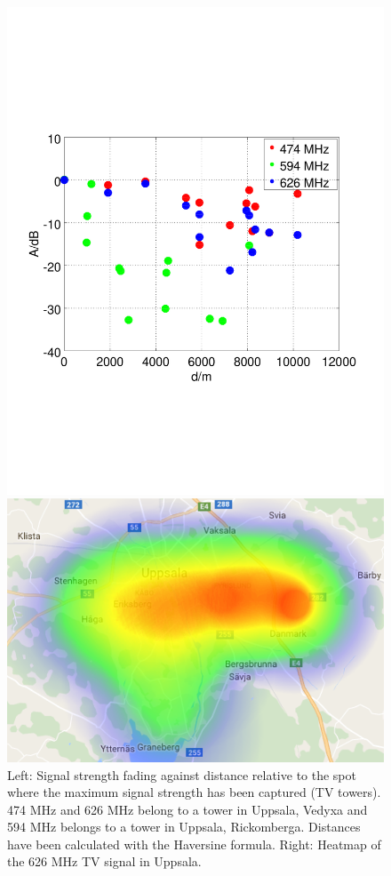 \documentclass[conference]{IEEEtran}
\begin{document}
\begin{figure}[h]
	\centering
	\begin{minipage}{0.49\columnwidth}
	\includegraphics[width=\columnwidth]{./fig/haversine}
	\end{minipage}
	\hfill
	\begin{minipage}{0.49\columnwidth}
	\includegraphics[width=\columnwidth]{./fig/heatmap_626mhz}
	\end{minipage}
	\caption{Left: Signal strength fading against distance relative
to the spot where the maximum signal strength has been captured (TV
towers). 474 MHz and 626 MHz belong to a tower in Uppsala, Vedyxa and
594 MHz belongs to a tower in Uppsala, Rickomberga. Distances have been
calculated with the Haversine formula. Right: Heatmap of the 626 MHz TV
signal in Uppsala.}
 

\end{figure}
\end{document}
